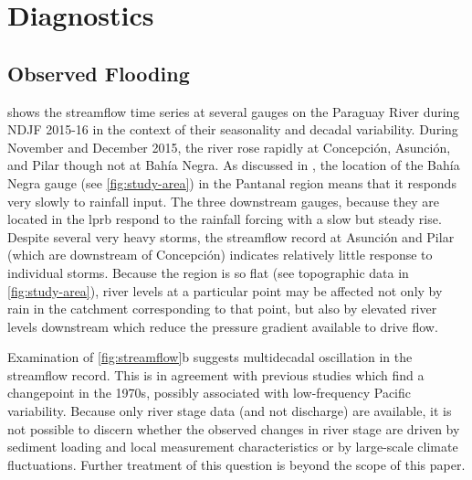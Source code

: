 \documentclass[twocol]{ametsoc}
\begin{document}

\section{Diagnostics} \label{sec:diagnostics}


\subsection{Observed Flooding} \label{sec:flood}

 shows the streamflow time series at several gauges on the Paraguay River during NDJF 2015-16 in the context of their seasonality and decadal variability.
During November and December 2015, the river rose rapidly at Concepci\'on, Asunci\'on, and Pilar though not at Bah\'ia Negra.
As discussed in \citet{Bravo2011,Barros2004}, the location of the Bah\'ia Negra gauge (see \cref{fig:study-area}) in the Pantanal region means that it responds very slowly to rainfall input.
The three downstream gauges, because they are located in the \gls{lprb} respond to the rainfall forcing with a slow but steady rise.
Despite several very heavy storms, the streamflow record at Asunci\'on and Pilar (which are downstream of Concepci\'on) indicates relatively little response to individual storms.
Because the region is so flat (see topographic data in \cref{fig:study-area}), river levels at a particular point may be affected not only by rain in the catchment corresponding to that point, but also by elevated river levels downstream which reduce the pressure gradient available to drive flow.

Examination of \cref{fig:streamflow}b suggests multidecadal oscillation in the streamflow record.
This is in agreement with previous studies \citep{Collischonn2001,Carvalho2011} which find a changepoint in the 1970s, possibly associated with low-frequency Pacific variability.
Because only river stage data (and not discharge) are available, it is not possible to discern whether the observed changes in river stage are driven by sediment loading and local measurement characteristics or by large-scale climate fluctuations.
Further treatment of this question is beyond the scope of this paper.
\end{document}
